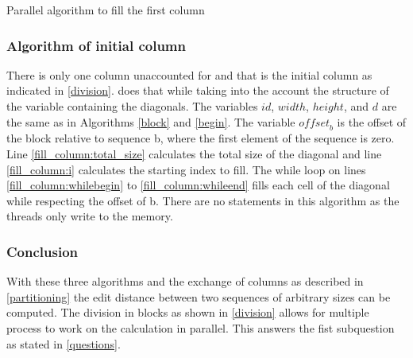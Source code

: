 \begin{algorithm}[ht]
\caption{Parallel algorithm to fill the first column} \label{fill_column}
\begin{algorithmic}[1]
    \Statex
    \label{fill_column:total_size}
    \label{fill_column:i}
    \Statex
    \label{fill_column:whilebegin}
        \label{fill_column:write}
        \label{fill_column:whilei}
    \EndWhile\label{fill_column:whileend}
\EndProcedure
\end{algorithmic}
\end{algorithm}

\subsubsection{Algorithm of initial column}
There is only one column unaccounted for and that is the initial column as indicated in \cref{division}.
 does that while taking into the account the structure of the variable containing the diagonals.
The variables $id$, $width$, $height$, and $d$ are the same as in Algorithms \ref{block} and \ref{begin}.
The variable $\mathit{offset}_b$ is the offset of the block relative to sequence b, where the first element of the sequence is zero.
Line \ref{fill_column:total_size} calculates the total size of the diagonal and line \ref{fill_column:i} calculates the starting index to fill.
The while loop on lines \ref{fill_column:whilebegin} to \ref{fill_column:whileend} fills each cell of the diagonal while respecting the offset of b.
There are no  statements in this algorithm as the threads only write to the memory.

\subsubsection{Conclusion}
With these three algorithms and the exchange of columns as described in \cref{partitioning} the edit distance between two sequences of arbitrary sizes can be computed.
The division in blocks as shown in \cref{division} allows for multiple process to work on the calculation in parallel.
This answers the fist subquestion as stated in \cref{questions}.

